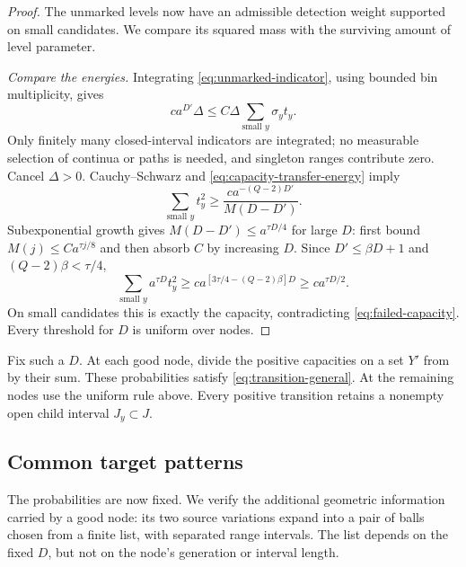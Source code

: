 \begin{proof}
The unmarked levels now have an admissible detection weight supported
on small candidates. We compare its squared mass with the surviving
amount of level parameter.

\emph{Compare the energies.}
Integrating \eqref{eq:unmarked-indicator}, using bounded bin multiplicity,
gives
\[
 ca^{D'}\Delta\leq C\Delta\sum_{\text{small }y}\sigma_y t_y.
\]
Only finitely many closed-interval indicators are integrated; no
measurable selection of continua or paths is needed, and singleton
ranges contribute zero. Cancel $\Delta>0$. Cauchy--Schwarz and
\eqref{eq:capacity-transfer-energy} imply
\begin{equation}
 \sum_{\text{small }y}t_y^2
 \geq\frac{ca^{-(Q-2)D'}}{M(D-D')}.
 \label{eq:small-square-capacity}
\end{equation}
Subexponential growth gives $M(D-D')\leq a^{\tau D/4}$ for large $D$: first
bound $M(j)\leq Ca^{\tau j/8}$ and then absorb $C$ by increasing $D$. Since $D'\leq\beta D+1$ and $(Q-2)\beta<\tau/4$,
\[
 \sum_{\text{small }y}a^{\tau D}t_y^2
 \geq ca^{[3\tau/4-(Q-2)\beta]D}
 \geq ca^{\tau D/2}.
\]
On small candidates this is exactly the capacity, contradicting
\eqref{eq:failed-capacity}. Every threshold for $D$ is uniform over nodes.
\end{proof}

Fix such a $D$. At each good node, divide the positive capacities on a
set $Y'$ from  by their sum. These
probabilities satisfy \eqref{eq:transition-general}. At the remaining
nodes use the uniform rule above. Every positive transition retains
a nonempty open child interval $J_y\subset J$.

\subsection{Common target patterns}

The probabilities are now fixed. We verify the additional geometric
information carried by a good node: its two source variations expand
into a pair of balls chosen from a finite list, with separated range
intervals. The list depends on the fixed $D$, but not on the node's
generation or interval length.

